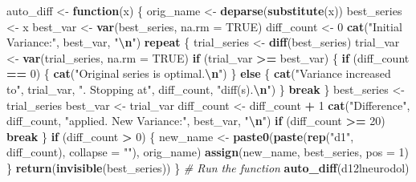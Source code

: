 \documentclass[
]{article}
\newenvironment{Shaded}{\begin{snugshade}}{\end{snugshade}}
\newcommand{\AttributeTok}[1]{\textcolor[rgb]{0.13,0.29,0.53}{#1}}
\newcommand{\CommentTok}[1]{\textcolor[rgb]{0.56,0.35,0.01}{\textit{#1}}}
\newcommand{\ConstantTok}[1]{\textcolor[rgb]{0.56,0.35,0.01}{#1}}
\newcommand{\ControlFlowTok}[1]{\textcolor[rgb]{0.13,0.29,0.53}{\textbf{#1}}}
\newcommand{\DecValTok}[1]{\textcolor[rgb]{0.00,0.00,0.81}{#1}}
\newcommand{\FunctionTok}[1]{\textcolor[rgb]{0.13,0.29,0.53}{\textbf{#1}}}
\newcommand{\NormalTok}[1]{#1}
\newcommand{\OtherTok}[1]{\textcolor[rgb]{0.56,0.35,0.01}{#1}}
\newcommand{\SpecialCharTok}[1]{\textcolor[rgb]{0.81,0.36,0.00}{\textbf{#1}}}
\newcommand{\StringTok}[1]{\textcolor[rgb]{0.31,0.60,0.02}{#1}}
\begin{document}
\begin{Shaded}
\begin{Highlighting}[]
\NormalTok{auto\_diff }\OtherTok{\textless{}{-}} \ControlFlowTok{function}\NormalTok{(x) \{}
\NormalTok{orig\_name }\OtherTok{\textless{}{-}} \FunctionTok{deparse}\NormalTok{(}\FunctionTok{substitute}\NormalTok{(x))}
\NormalTok{best\_series }\OtherTok{\textless{}{-}}\NormalTok{ x}
\NormalTok{best\_var }\OtherTok{\textless{}{-}} \FunctionTok{var}\NormalTok{(best\_series, }\AttributeTok{na.rm =} \ConstantTok{TRUE}\NormalTok{)}
\NormalTok{diff\_count }\OtherTok{\textless{}{-}} \DecValTok{0}
\FunctionTok{cat}\NormalTok{(}\StringTok{"Initial Variance:"}\NormalTok{, best\_var, }\StringTok{"}\SpecialCharTok{\textbackslash{}n}\StringTok{"}\NormalTok{)}
\ControlFlowTok{repeat}\NormalTok{ \{}
\NormalTok{trial\_series }\OtherTok{\textless{}{-}} \FunctionTok{diff}\NormalTok{(best\_series)}
\NormalTok{trial\_var }\OtherTok{\textless{}{-}} \FunctionTok{var}\NormalTok{(trial\_series, }\AttributeTok{na.rm =} \ConstantTok{TRUE}\NormalTok{)}
\ControlFlowTok{if}\NormalTok{ (trial\_var }\SpecialCharTok{\textgreater{}=}\NormalTok{ best\_var) \{}
\ControlFlowTok{if}\NormalTok{ (diff\_count }\SpecialCharTok{==} \DecValTok{0}\NormalTok{) \{}
\FunctionTok{cat}\NormalTok{(}\StringTok{"Original series is optimal.}\SpecialCharTok{\textbackslash{}n}\StringTok{"}\NormalTok{)}
\NormalTok{\} }\ControlFlowTok{else}\NormalTok{ \{}
\FunctionTok{cat}\NormalTok{(}\StringTok{"Variance increased to"}\NormalTok{, trial\_var, }\StringTok{". Stopping at"}\NormalTok{, diff\_count, }\StringTok{"diff(s).}\SpecialCharTok{\textbackslash{}n}\StringTok{"}\NormalTok{)}
\NormalTok{\}}
\ControlFlowTok{break}
\NormalTok{\}}
\NormalTok{best\_series }\OtherTok{\textless{}{-}}\NormalTok{ trial\_series}
\NormalTok{best\_var }\OtherTok{\textless{}{-}}\NormalTok{ trial\_var}
\NormalTok{diff\_count }\OtherTok{\textless{}{-}}\NormalTok{ diff\_count }\SpecialCharTok{+} \DecValTok{1}
\FunctionTok{cat}\NormalTok{(}\StringTok{"Difference"}\NormalTok{, diff\_count, }\StringTok{"applied. New Variance:"}\NormalTok{, best\_var, }\StringTok{"}\SpecialCharTok{\textbackslash{}n}\StringTok{"}\NormalTok{)}
\ControlFlowTok{if}\NormalTok{ (diff\_count }\SpecialCharTok{\textgreater{}=} \DecValTok{20}\NormalTok{) }\ControlFlowTok{break}
\NormalTok{\}}
\ControlFlowTok{if}\NormalTok{ (diff\_count }\SpecialCharTok{\textgreater{}} \DecValTok{0}\NormalTok{) \{}
\NormalTok{new\_name }\OtherTok{\textless{}{-}} \FunctionTok{paste0}\NormalTok{(}\FunctionTok{paste}\NormalTok{(}\FunctionTok{rep}\NormalTok{(}\StringTok{"d1"}\NormalTok{, diff\_count), }\AttributeTok{collapse =} \StringTok{""}\NormalTok{), orig\_name)}
\FunctionTok{assign}\NormalTok{(new\_name, best\_series, }\AttributeTok{pos =} \DecValTok{1}\NormalTok{)}
\NormalTok{\}}
\FunctionTok{return}\NormalTok{(}\FunctionTok{invisible}\NormalTok{(best\_series))}
\NormalTok{\}}
\CommentTok{\# Run the function}
\FunctionTok{auto\_diff}\NormalTok{(d12lneurodol)}
\end{Highlighting}
\end{Shaded}
\end{document}
